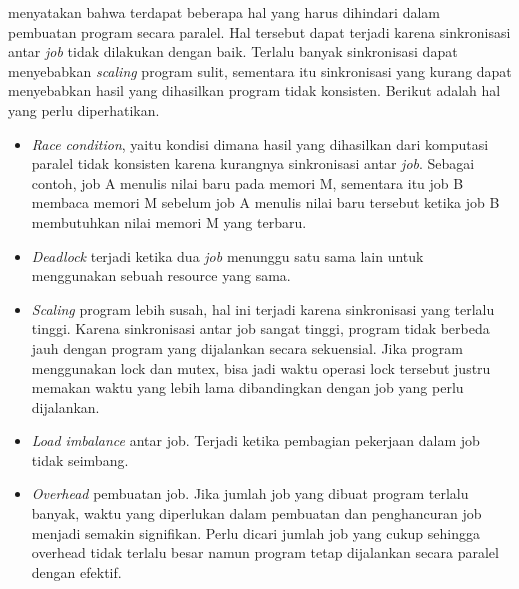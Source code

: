 \citep{structured_parallel_programming} menyatakan bahwa terdapat beberapa hal yang harus dihindari dalam pembuatan program secara paralel. Hal tersebut dapat terjadi karena sinkronisasi antar \textit{job} tidak dilakukan dengan baik. Terlalu banyak sinkronisasi dapat menyebabkan \textit{scaling} program sulit, sementara itu sinkronisasi yang kurang dapat menyebabkan hasil yang dihasilkan program tidak konsisten. Berikut adalah hal yang perlu diperhatikan.
\begin{itemize}
  \item \textit{Race condition}, yaitu kondisi dimana hasil yang dihasilkan dari komputasi paralel tidak konsisten karena kurangnya sinkronisasi antar \textit{job}. Sebagai contoh, job A menulis nilai baru pada memori M, sementara itu job B membaca memori M sebelum job A menulis nilai baru tersebut ketika job B membutuhkan nilai memori M yang terbaru.
  \item \textit{Deadlock} terjadi ketika dua \textit{job} menunggu satu sama lain untuk menggunakan sebuah resource yang sama.
  \item \textit{Scaling} program lebih susah, hal ini terjadi karena sinkronisasi yang terlalu tinggi. Karena sinkronisasi antar job sangat tinggi, program tidak berbeda jauh dengan program yang dijalankan secara sekuensial. Jika program menggunakan lock dan mutex, bisa jadi waktu operasi lock tersebut justru memakan waktu yang lebih lama dibandingkan dengan job yang perlu dijalankan.
  \item \textit{Load imbalance} antar job. Terjadi ketika pembagian pekerjaan dalam job tidak seimbang.
  \item \textit{Overhead} pembuatan job. Jika jumlah job yang dibuat program terlalu banyak, waktu yang diperlukan dalam pembuatan dan penghancuran job menjadi semakin signifikan. Perlu dicari jumlah job yang cukup sehingga overhead tidak terlalu besar namun program tetap dijalankan secara paralel dengan efektif.
\end{itemize} 
